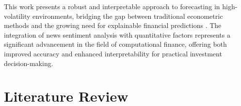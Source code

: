 \documentclass[3p,times,procedia]{elsarticle}
\begin{document}
This work presents a robust and interpretable approach to forecasting in high-volatility environments, bridging the gap between traditional econometric methods and the growing need for explainable financial predictions \cite{TETLOCK2007,Ribeiro2016}. The integration of news sentiment analysis with quantitative factors represents a significant advancement in the field of computational finance, offering both improved accuracy and enhanced interpretability for practical investment decision-making.



\section{Literature Review}
\end{document}
